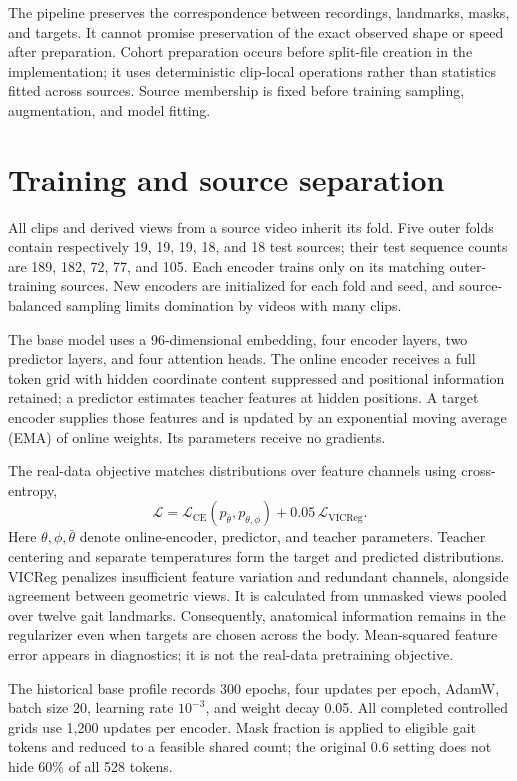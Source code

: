 \documentclass{article}
\begin{document}
The pipeline preserves the correspondence between recordings, landmarks, masks, and targets. It cannot promise preservation of the exact observed shape or speed after preparation. Cohort preparation occurs before split-file creation in the implementation; it uses deterministic clip-local operations rather than statistics fitted across sources. Source membership is fixed before training sampling, augmentation, and model fitting.

\section{Training and source separation}\label{training-and-source-separation}

All clips and derived views from a source video inherit its fold. Five outer folds contain respectively 19, 19, 19, 18, and 18 test sources; their test sequence counts are 189, 182, 72, 77, and 105. Each encoder trains only on its matching outer-training sources. New encoders are initialized for each fold and seed, and source-balanced sampling limits domination by videos with many clips.

The base model uses a 96-dimensional embedding, four encoder layers, two predictor layers, and four attention heads. The online encoder receives a full token grid with hidden coordinate content suppressed and positional information retained; a predictor estimates teacher features at hidden positions. A target encoder supplies those features and is updated by an exponential moving average (EMA) of online weights. Its parameters receive no gradients.

The real-data objective matches distributions over feature channels using cross-entropy, \[
\mathcal L=\mathcal L_{\mathrm{CE}}(p_{\bar\theta},p_{\theta,\phi})
+0.05\,\mathcal L_{\mathrm{VICReg}}.
\] Here \(\theta,\phi,\bar\theta\) denote online-encoder, predictor, and teacher parameters. Teacher centering and separate temperatures form the target and predicted distributions. VICReg penalizes insufficient feature variation and redundant channels, alongside agreement between geometric views. It is calculated from unmasked views pooled over twelve gait landmarks. Consequently, anatomical information remains in the regularizer even when targets are chosen across the body. Mean-squared feature error appears in diagnostics; it is not the real-data pretraining objective.

The historical base profile records 300 epochs, four updates per epoch, AdamW, batch size 20, learning rate \(10^{-3}\), and weight decay 0.05. All completed controlled grids use 1,200 updates per encoder. Mask fraction is applied to eligible gait tokens and reduced to a feasible shared count; the original 0.6 setting does not hide 60\% of all 528 tokens.
\end{document}
